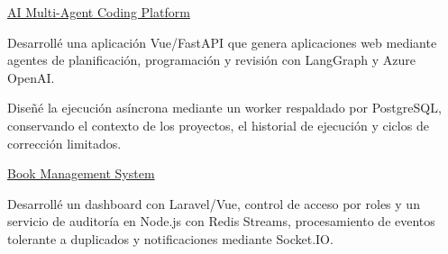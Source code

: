 
{\intersemibold\href{https://guada-franco.pages.dev/es/projects/ai-coding-agent-pipeline}{AI Multi-Agent Coding Platform}}

\begin{jobitems}
\item Desarrollé una aplicación Vue/FastAPI que genera aplicaciones web mediante agentes de planificación, programación y revisión con LangGraph y Azure OpenAI.
\item Diseñé la ejecución asíncrona mediante un worker respaldado por PostgreSQL, conservando el contexto de los proyectos, el historial de ejecución y ciclos de corrección limitados.
\end{jobitems}

{\intersemibold\href{https://guada-franco.pages.dev/es/projects/book-management-system}{Book Management System}}

\begin{jobitems}
\item Desarrollé un dashboard con Laravel/Vue, control de acceso por roles y un servicio de auditoría en Node.js con Redis Streams, procesamiento de eventos tolerante a duplicados y notificaciones mediante Socket.IO.
\end{jobitems}
